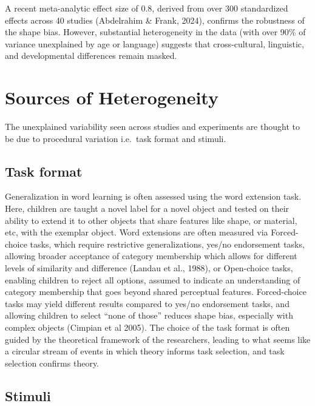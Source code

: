 \documentclass[10pt, letterpaper]{article}
\begin{document}
A recent meta-analytic effect size of 0.8, derived from over 300
standardized effects across 40 studies (Abdelrahim \& Frank, 2024),
confirms the robustness of the shape bias. However, substantial
heterogeneity in the data (with over 90\% of variance unexplained by age
or language) suggests that cross-cultural, linguistic, and developmental
differences remain masked.

\hypertarget{sources-of-heterogeneity}{%
\section{Sources of Heterogeneity}\label{sources-of-heterogeneity}}

The unexplained variability seen across studies and experiments are
thought to be due to procedural variation i.e.~task format and stimuli.

\hypertarget{task-format}{%
\subsection{Task format}\label{task-format}}

Generalization in word learning is often assessed using the word
extension task. Here, children are taught a novel label for a novel
object and tested on their ability to extend it to other objects that
share features like shape, or material, etc, with the exemplar object.
Word extensions are often measured via Forced-choice tasks, which
require restrictive generalizations, yes/no endorsement tasks, allowing
broader acceptance of category membership which allows for different
levels of similarity and difference (Landau et al., 1988), or
Open-choice tasks, enabling children to reject all options, assumed to
indicate an understanding of category membership that goes beyond shared
perceptual features. Forced-choice tasks may yield different results
compared to yes/no endorsement tasks, and allowing children to select
``none of those'' reduces shape bias, especially with complex objects
(Cimpian et al 2005). The choice of the task format is often guided by
the theoretical framework of the researchers, leading to what seems like
a circular stream of events in which theory informs task selection, and
task selection confirms theory.

\hypertarget{stimuli}{%
\subsection{Stimuli}\label{stimuli}}
\end{document}
